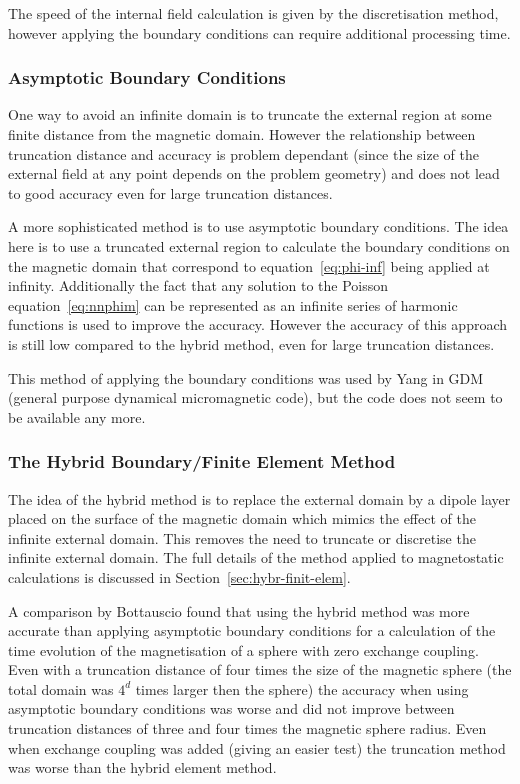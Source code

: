 The speed of the internal field calculation is given by the discretisation method, however applying the boundary conditions can require additional processing time.


\subsubsection{Asymptotic Boundary Conditions}
\label{sec:asymptot-bcs}

One way to avoid an infinite domain is to truncate the external region at some finite distance from the magnetic domain. However the relationship between truncation distance and accuracy is problem dependant (since the size of the external field at any point depends on the problem geometry) and does not lead to good accuracy even for large truncation distances.

A more sophisticated method is to use asymptotic boundary conditions.\cite{Yang1997} The idea here is to use a truncated external region to calculate the boundary conditions on the magnetic domain that correspond to equation~\eqref{eq:phi-inf} being applied at infinity. Additionally the fact that any solution to the Poisson equation~\eqref{eq:nnphim} can be represented as an infinite series of harmonic functions is used to improve the accuracy. However the accuracy of this approach is still low compared to the hybrid method, even for large truncation distances.\cite{Bottauscio2008}

This method of applying the boundary conditions was used by Yang in GDM\cite{Yang1997} (general purpose dynamical micromagnetic code), but the code does not seem to be available any more.

\subsubsection{The Hybrid Boundary/Finite Element Method}
\label{sec:bound-elem-meth}

The idea of the hybrid method is to replace the external domain by a dipole layer placed on the surface of the magnetic domain which mimics the effect of the infinite external domain. This removes the need to truncate or discretise the infinite external domain. The full details of the method applied to magnetostatic calculations is discussed in Section~\ref{sec:hybr-finit-elem}.

A comparison by Bottauscio\cite{Bottauscio2008} found that using the hybrid method was more accurate than applying asymptotic boundary conditions for a calculation of the time evolution of the magnetisation of a sphere with zero exchange coupling. Even with a truncation distance of four times the size of the magnetic sphere (the total domain was $4^d$ times larger then the sphere) the accuracy when using asymptotic boundary conditions was worse and did not improve between truncation distances of three and four times the magnetic sphere radius. Even when exchange coupling was added (giving an easier test) the truncation method was worse than the hybrid element method.


